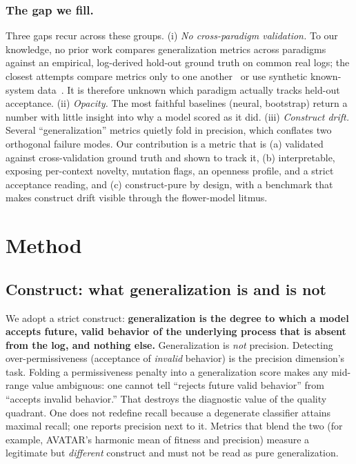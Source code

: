\documentclass[runningheads]{llncs}
\begin{document}
\subsubsection{The gap we fill.}
Three gaps recur across these groups. (i) \emph{No cross-paradigm validation.} To our knowledge, no prior work compares generalization metrics across paradigms against an empirical, log-derived hold-out ground truth on common real logs; the closest attempts compare metrics only to one another~\cite{janssenswillen2017comparative} or use synthetic known-system data~\cite{janssenswillen2019confirmatory}. It is therefore unknown which paradigm actually tracks held-out acceptance. (ii) \emph{Opacity.} The most faithful baselines (neural, bootstrap) return a number with little insight into why a model scored as it did. (iii) \emph{Construct drift.} Several ``generalization'' metrics quietly fold in precision, which conflates two orthogonal failure modes. Our contribution is a metric that is (a) validated against cross-validation ground truth and shown to track it, (b) interpretable, exposing per-context novelty, mutation flags, an openness profile, and a strict acceptance reading, and (c) construct-pure by design, with a benchmark that makes construct drift visible through the flower-model litmus.

\section{Method}
\label{sec:method}

\subsection{Construct: what generalization is and is not}
\label{sec:method:construct}
We adopt a strict construct: \textbf{generalization is the degree to which a model accepts future, valid behavior of the underlying process that is absent from the log, and nothing else.} Generalization is \emph{not} precision. Detecting over-permissiveness (acceptance of \emph{invalid} behavior) is the precision dimension's task. Folding a permissiveness penalty into a generalization score makes any mid-range value ambiguous: one cannot tell ``rejects future valid behavior'' from ``accepts invalid behavior.'' That destroys the diagnostic value of the quality quadrant. One does not redefine recall because a degenerate classifier attains maximal recall; one reports precision next to it. Metrics that blend the two (for example, AVATAR's harmonic mean of fitness and precision) measure a legitimate but \emph{different} construct and must not be read as pure generalization.
\end{document}
